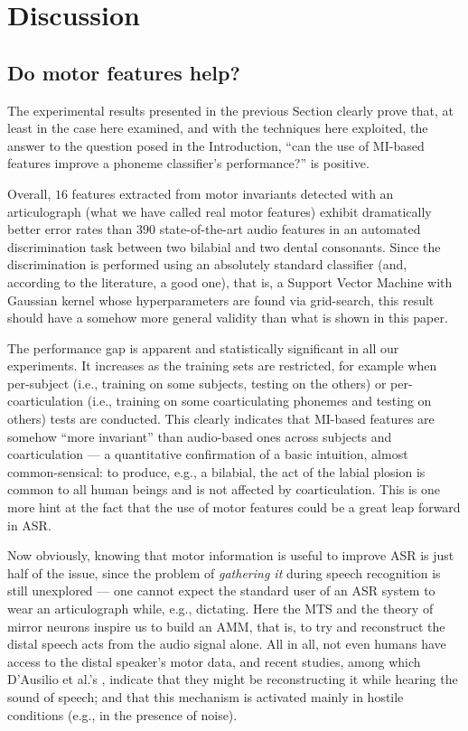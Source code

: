 \section{Discussion}
\label{sec:disc}

\subsection{Do motor features help?}

The experimental results presented in the previous Section clearly prove that,
at least in the case here examined, and with the techniques here exploited,
the answer to the question posed in the Introduction, ``can the use of MI-based
features improve a phoneme classifier's performance?'' is positive.

Overall, $16$ features extracted from motor invariants detected with an articulograph
(what we have called real motor features) exhibit dramatically better error rates
than $390$ state-of-the-art audio features in an automated discrimination task between
two bilabial and two dental consonants. Since the discrimination is performed using an
absolutely standard classifier (and, according to the literature, a good one), that is,
a Support Vector Machine with Gaussian kernel whose hyperparameters are found via
grid-search, this result should have a somehow more general validity than what is shown
in this paper.

The performance gap is apparent and statistically significant in all our experiments.
It increases as the training sets are restricted, for example
when per-subject (i.e., training on some subjects, testing on the others) or
per-coarticulation (i.e., training on some coarticulating phonemes and testing on
others) tests are conducted. This clearly indicates that MI-based features are
somehow ``more invariant'' than audio-based ones across subjects and
coarticulation --- a quantitative confirmation of a basic
intuition, almost common-sensical: to produce, e.g., a bilabial, the act of
the labial plosion is common to all human beings and is not affected by
coarticulation. This is one more hint at the fact that the use of motor features
could be a great leap forward in ASR.

Now obviously, knowing that motor information is useful to improve ASR is just half
of the issue, since the problem of \emph{gathering it} during speech recognition is
still unexplored --- one cannot expect the standard user of an ASR system to wear
an articulograph while, e.g., dictating. Here the MTS and the theory of mirror neurons
inspire us to build an AMM, that is, to try and reconstruct the distal speech acts from
the audio signal alone. All in all, not even humans have access to the distal speaker's
motor data, and recent studies, among which D'Ausilio et al.'s \cite{dausilio}, indicate
that they might be reconstructing it while hearing the sound of speech; and that this
mechanism is activated mainly in hostile conditions (e.g., in the presence of noise).

